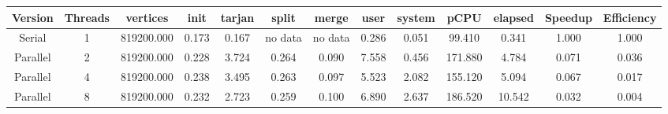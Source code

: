 \begin{tabular}{|c|c|c|c|c|c|c|c|c|c|c|c|c|}
\toprule
 Version &  Threads &   vertices &  init &  tarjan &   split &   merge &  user &  system &    pCPU &  elapsed &  Speedup &  Efficiency \\
\midrule
  Serial &        1 & 819200.000 & 0.173 &   0.167 & no data & no data & 0.286 &   0.051 &  99.410 &    0.341 &    1.000 &       1.000 \\
Parallel &        2 & 819200.000 & 0.228 &   3.724 &   0.264 &   0.090 & 7.558 &   0.456 & 171.880 &    4.784 &    0.071 &       0.036 \\
Parallel &        4 & 819200.000 & 0.238 &   3.495 &   0.263 &   0.097 & 5.523 &   2.082 & 155.120 &    5.094 &    0.067 &       0.017 \\
Parallel &        8 & 819200.000 & 0.232 &   2.723 &   0.259 &   0.100 & 6.890 &   2.637 & 186.520 &   10.542 &    0.032 &       0.004 \\
\bottomrule
\end{tabular}

